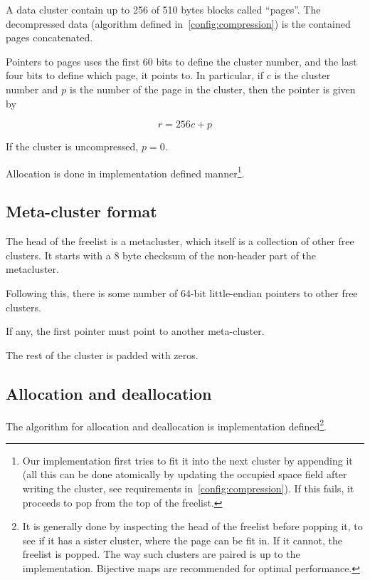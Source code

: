 \documentclass[11pt,a4paper]{report}
\newcommand{\clusterheader}{2 }
\newcommand{\clustersize}{512 }
\newcommand{\maxpagesincluster}{256 }
\newcommand{\metaclustercksum}{8 }
\newcommand{\pagesize}{510 } %
\begin{document}
        A data cluster contain up to \maxpagesincluster of \pagesize bytes
        blocks called ``pages''. The decompressed data (algorithm defined
        in~\ref{config:compression}) is the contained pages concatenated.

        Pointers to pages uses the first 60 bits to define the cluster number,
        and the last four bits to define which page, it points to. In
        particular, if $c$ is the cluster number and $p$ is the number of the
        page in the cluster, then the pointer is given by

        $$r = \maxpagesincluster c + p$$

        If the cluster is uncompressed, $p = 0$.

        Allocation is done in implementation defined manner\footnote{Our
        implementation first tries to fit it into the next cluster by
        appending it (all this can be done atomically by updating the
        occupied space field after writing the cluster, see requirements
        in~\ref{config:compression}). If this fails, it proceeds to pop
        from the top of the freelist.}.

        \subsection{Meta-cluster format}
        \label{cluster:metacluster}
        The head of the freelist is a metacluster, which itself is a collection
        of other free clusters. It starts with a \metaclustercksum byte
        checksum of the non-header part of the metacluster.

        Following this, there is some number of 64-bit little-endian pointers
        to other free clusters.

        If any, the first pointer must point to another meta-cluster.

        The rest of the cluster is padded with zeros.

        \subsection{Allocation and deallocation}
        The algorithm for allocation and deallocation is implementation
        defined\footnote{It is generally done by inspecting the head of the
            freelist before popping it, to see if it has a sister cluster,
            where the page can be fit in. If it cannot, the freelist is popped.
            The way such clusters are paired is up to the implementation.
            Bijective maps are recommended for optimal performance.}.
\end{document}
